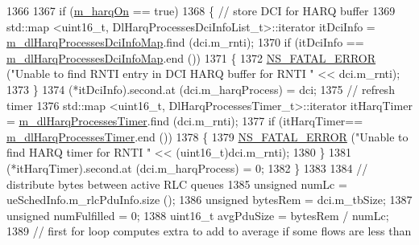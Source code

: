 \begin{DoxyCode}
1366 
1367                         \textcolor{keywordflow}{if} (\hyperlink{classns3_1_1MmWaveFlexTtiMacScheduler_a832729b006315bb770e9f50c16305118}{m\_harqOn} == \textcolor{keyword}{true})
1368                         \{       \textcolor{comment}{// store DCI for HARQ buffer}
1369                                 std::map <uint16\_t, DlHarqProcessesDciInfoList\_t>::iterator itDciInfo = 
      \hyperlink{classns3_1_1MmWaveFlexTtiMacScheduler_a2820fea8cd85e2351bc0b046bdfb8414}{m\_dlHarqProcessesDciInfoMap}.find (dci.m\_rnti);
1370                                 \textcolor{keywordflow}{if} (itDciInfo == \hyperlink{classns3_1_1MmWaveFlexTtiMacScheduler_a2820fea8cd85e2351bc0b046bdfb8414}{m\_dlHarqProcessesDciInfoMap}.end
       ())
1371                                 \{
1372                                         \hyperlink{group__fatal_ga5131d5e3f75d7d4cbfd706ac456fdc85}{NS\_FATAL\_ERROR} (\textcolor{stringliteral}{"Unable to find RNTI entry in DCI
       HARQ buffer for RNTI "} << dci.m\_rnti);
1373                                 \}
1374                                 (*itDciInfo).second.at (dci.m\_harqProcess) = dci;
1375                                 \textcolor{comment}{// refresh timer}
1376                                 std::map <uint16\_t, DlHarqProcessesTimer\_t>::iterator itHarqTimer =  
      \hyperlink{classns3_1_1MmWaveFlexTtiMacScheduler_a321e6f7863545e750acf6e94855514c5}{m\_dlHarqProcessesTimer}.find (dci.m\_rnti);
1377                                 \textcolor{keywordflow}{if} (itHarqTimer== \hyperlink{classns3_1_1MmWaveFlexTtiMacScheduler_a321e6f7863545e750acf6e94855514c5}{m\_dlHarqProcessesTimer}.end ())
1378                                 \{
1379                                         \hyperlink{group__fatal_ga5131d5e3f75d7d4cbfd706ac456fdc85}{NS\_FATAL\_ERROR} (\textcolor{stringliteral}{"Unable to find HARQ timer for RNTI "}
       << (uint16\_t)dci.m\_rnti);
1380                                 \}
1381                                 (*itHarqTimer).second.at (dci.m\_harqProcess) = 0;
1382                         \}
1383 
1384                         \textcolor{comment}{// distribute bytes between active RLC queues}
1385                         \textcolor{keywordtype}{unsigned} numLc = ueSchedInfo.m\_rlcPduInfo.size ();
1386                         \textcolor{keywordtype}{unsigned} bytesRem = dci.m\_tbSize;
1387                         \textcolor{keywordtype}{unsigned} numFulfilled = 0;
1388                         uint16\_t avgPduSize = bytesRem / numLc;
1389                         \textcolor{comment}{// first for loop computes extra to add to average if some flows are less than
}
\end{DoxyCode}
